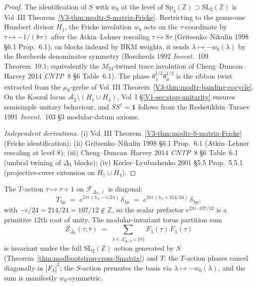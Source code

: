 \begin{proof}
The identification of $S$ with $w_8$ at the level of
$\mathrm{Sp}_4(\mathbb Z)\supset\mathrm{SL}_2(\mathbb Z)$
is Vol~III Theorem~\ref{V3-thm:modtr-S-matrix-Fricke}.
Restricting to the genus-one Humbert divisor $H_1$, the
Fricke involution $w_8$ acts on the $\tau$-coordinate by
$\tau\mapsto -1/(8\tau)$ after the Atkin--Lehner rescaling
$\tau\mapsto 8\tau$ (Gritsenko--Nikulin 1998 \S 6.1 Prop.~6.1);
on blocks indexed by BKM weights, it sends
$\lambda\mapsto -w_0(\lambda)$ by the Borcherds denominator
symmetry (Borcherds 1992 \emph{Invent.}~109 Theorem~10.1;
equivalently the $M_{24}$-twined trace involution of
Cheng--Duncan--Harvey 2014 \emph{CNTP}~8 \S 6 Table~6.1).
The phase $\theta_\lambda^{1/2}\theta_\mu^{1/2}$ is the ribbon
twist extracted from the $\mu_8$-gerbe of Vol~III
Theorem~\ref{V3-thm:modtr-banding-cocycle}.
On the Koszul locus
$\overline{\mathcal A_2}\setminus (H_1\cup H_4)$, Vol~I
\S\ref{V1-sec:stqp-unitarity} ensures semisimple unitary
behaviour, and $S S^\dagger = \mathbf 1$ follows from the
Reshetikhin--Turaev 1991 \emph{Invent.}~103 \S 3
modular-datum axioms.

\emph{Independent derivations.}
(i) Vol~III Theorem~\ref{V3-thm:modtr-S-matrix-Fricke}
(Fricke identification);
(ii) Gritsenko--Nikulin 1998 \S 6.1 Prop.~6.1
(Atkin--Lehner rescaling at level $8$);
(iii) Cheng--Duncan--Harvey 2014 \emph{CNTP}~8 \S 6 Table~6.1
(umbral twining of $\Delta_5$ blocks);
(iv) Kerler--Lyubashenko 2001 \S 5.5 Prop.~5.5.1
(projective-cover extension on $H_1\cup H_4$).
\end{proof}

\begin{proposition}
\label{prop:modbootstrap-cross-Tmatrix}
The $T$-action $\tau\mapsto\tau + 1$ on $\mathcal F_{\Delta_5, \ell}$
is diagonal:
\[
 T_{\lambda\mu} \;=\; e^{2\pi i\,(h_\lambda - c/24)}\,\delta_{\lambda\mu}
 \;=\; e^{2\pi i\,(h_\lambda + 214/24)}\,\delta_{\lambda\mu},
\]
with $-c/24 = 214/24 = 107/12\notin\mathbb Z$, so the scalar
prefactor $e^{2\pi i\cdot 107/12}$ is a primitive $12$th root of
unity. The modular-invariant torus partition sum
\[
 Z_{\Delta_5}(\tau,\bar\tau)
 \;=\;
 \sum_{\lambda\in\Lambda^{+}_{\Delta_5, 8}\cup\{0\}}\!\!
 F_\lambda(\tau)\,\overline{F_\lambda(\tau)}
\]
is invariant under the full $\mathrm{SL}_2(\mathbb Z)$ action
generated by $S$ (Theorem~\ref{thm:modbootstrap-cross-Smatrix}) and
$T$: the $T$-action phases cancel diagonally in
$|F_\lambda|^2$; the $S$-action permutes the basis via
$\lambda\mapsto -w_0(\lambda)$, and the sum is manifestly
$w_0$-symmetric.
\end{proposition}

